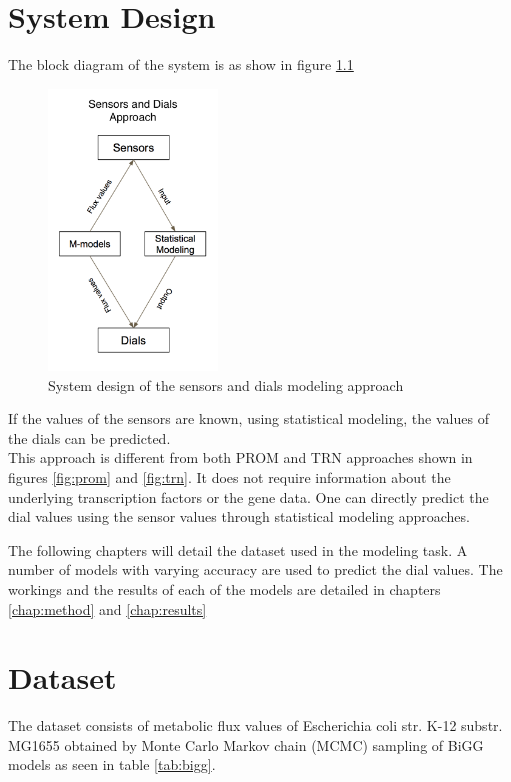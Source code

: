 \documentclass[12pt,chapterheads]{ucsd}
\begin{document}
\chapter{System Design}
The block diagram of the system is as show in figure \ref{fig:sys}

\begin{figure}[h] 
\centering
\includegraphics[width=0.4\textwidth]{my_model}
\caption[System design of the sensors and dials modeling approach]
{System design of the sensors and dials modeling approach}
\label{fig:sys}
\end{figure}

\vspace{0.25in}
If the values of the sensors are known, using statistical modeling, the values of the dials can be predicted.\\
This approach is different from both PROM and TRN approaches shown in figures \ref{fig:prom} and \ref{fig:trn}. It does not require information about the underlying transcription factors or the gene data. One can directly predict the dial values using the sensor values through statistical modeling approaches.

The following chapters will detail the dataset used in the modeling task. A number of models with varying accuracy are used to predict the dial values. The workings and the results of each of the models are detailed in chapters \ref{chap:method} and \ref{chap:results}

\chapter{Dataset}

The dataset consists of metabolic flux values of Escherichia coli str. K-12 substr. MG1655 \cite{Blattner1453} obtained by Monte Carlo Markov chain (MCMC) sampling of BiGG \cite{doi:10.1093/nar/gkv1049} models as seen in table \ref{tab:bigg}. 
\end{document}
